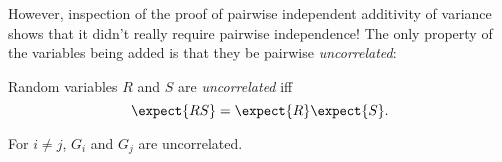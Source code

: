 However, inspection of the proof of pairwise independent additivity of
variance shows that it didn't really require pairwise independence!  The
only property of the variables being added is that they be pairwise
\emph{uncorrelated}:

\begin{definition*}
Random variables $R$ and $S$ are \emph{uncorrelated} iff
\begin{equation}\label{LN12:uncor}
\expect{RS} = \expect{R}\expect{S}.
\end{equation}
\end{definition*}

\begin{lemma}\label{LN12:Guncor}
For $i \neq j$, $G_i$ and $G_j$ are uncorrelated.
\end{lemma}
\fi

